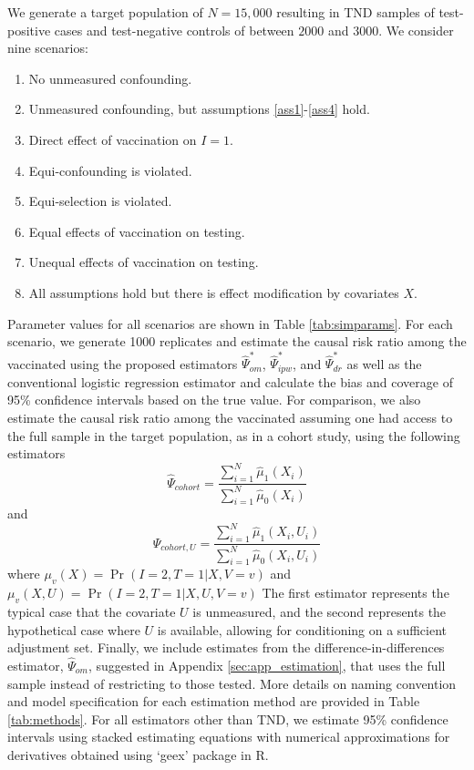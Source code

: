 \begin{appendix}
 We generate a target population of $N = 15,000$ resulting in TND samples of test-positive cases and test-negative controls of between $2000$ and $3000$. We consider nine scenarios: 
 \begin{enumerate}
    \item No unmeasured confounding.
    \item Unmeasured confounding, but assumptions \ref{ass1}-\ref{ass4} hold.
    \item Direct effect of vaccination on $I=1$.
    \item Equi-confounding is violated.
    \item Equi-selection is violated.
    \item Equal effects of vaccination on testing.
    \item Unequal effects of vaccination on testing.
    \item All assumptions hold but there is effect modification by covariates $X$.
 \end{enumerate}
 Parameter values for all scenarios are shown in Table \ref{tab:simparams}. For each scenario, we generate 1000 replicates and estimate the causal risk ratio among the vaccinated using the proposed estimators $\widehat{\Psi}_{om}^*$, $\widehat{\Psi}_{ipw}^*$, and $\widehat{\Psi}_{dr}^*$ as well as the conventional logistic regression estimator and calculate the bias and coverage of 95\% confidence intervals based on the true value. For comparison, we also estimate the causal risk ratio among the vaccinated assuming one had access to the full sample in the target population, as in a cohort study, using the following estimators
 \begin{equation}\label{eqn:cohort_estimator}
    \widehat{\Psi}_{cohort} = \dfrac{\sum_{i=1}^N\widehat{\mu}_1(X_i)}{\sum_{i=1}^N\widehat{\mu}_0(X_i)}
 \end{equation}
 and 
 \begin{equation}\label{eqn:cohort_u_estimator}
    \widehat{\Psi}_{cohort,U} = \dfrac{\sum_{i=1}^N\widehat{\mu}_1(X_i, U_i)}{\sum_{i=1}^N\widehat{\mu}_0(X_i, U_i)}
 \end{equation}
 where $\mu_v(X) = \Pr(I=2, T=1 | X, V=v)$ and $\mu_v(X,U) = \Pr(I=2, T=1 | X, U, V=v)$
 The first estimator represents the typical case that the covariate $U$ is unmeasured, and the second represents the hypothetical case where $U$ is available, allowing for conditioning on a sufficient adjustment set. Finally, we include estimates from the difference-in-differences estimator, $\widehat{\Psi}_{om}$, suggested in Appendix \ref{sec:app_estimation}, that uses the full sample instead of restricting to those tested. More details on naming convention and model specification for each estimation method are provided in Table \ref{tab:methods}. For all estimators other than TND, we estimate 95\% confidence intervals using stacked estimating equations with numerical approximations for derivatives obtained using `geex' package in R.




\end{appendix}
